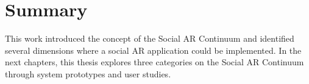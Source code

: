 


\section{Summary}

This work introduced the concept of the Social AR Continuum and identified several dimensions where a social AR application could be implemented.
In the next chapters, 
this thesis explores three categories on the Social AR Continuum through system prototypes and user studies.

